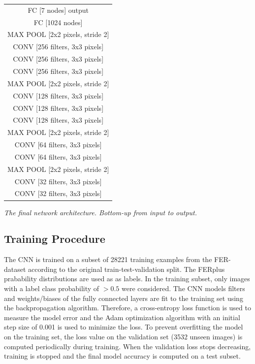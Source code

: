 \documentclass[twoside]{article}
\begin{document}
\begin{multicols}{2}
\begin{tabular}{|| c ||}
  \hline
  FC [7 nodes] output\\
  FC [1024 nodes]\\
  \hline
  MAX POOL [2x2 pixels, stride 2]\\
  CONV [256 filters, 3x3 pixels]\\
  CONV [256 filters, 3x3 pixels]\\
  CONV [256 filters, 3x3 pixels]\\
  \hline
  MAX POOL [2x2 pixels, stride 2]\\
  CONV [128 filters, 3x3 pixels]\\
  CONV [128 filters, 3x3 pixels]\\
  CONV [128 filters, 3x3 pixels]\\
  \hline
  MAX POOL [2x2 pixels, stride 2]\\
  CONV [64 filters, 3x3 pixels]\\
  CONV [64 filters, 3x3 pixels]\\
  \hline
  MAX POOL [2x2 pixels, stride 2]\\
  CONV [32 filters, 3x3 pixels]\\
  CONV [32 filters, 3x3 pixels]\\
  \hline
    
\end{tabular}

\medskip

\textit{The final network architecture. Bottom-up from input to output.}


\subsection{Training Procedure}
The CNN is trained on a subset of 28221 training examples from the FER-dataset according to the original train-test-validation split. The FERplus prabability distributions are used as as labels. In the training subset, only images with a label class probability of $> 0.5$ were considered. The CNN models filters and weights/biases of the fully connected layers are fit to the training set using the backpropagation algorithm. Therefore, a cross-entropy loss function is used to measure the model error and the Adam optimization algorithm with an initial step size of 0.001 is used to minimize the loss. To prevent overfitting the model on the training set, the loss value on the validation set (3532 unseen images) is computed periodically during training. When the validation loss stops decreasing, training is stopped and the final model accuracy is computed on a test subset.



\end{multicols}
\end{document}
